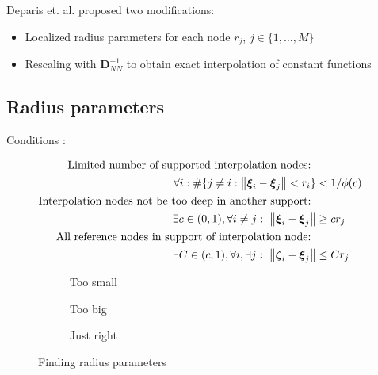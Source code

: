 \documentclass[11pt, a4paper]{article}
\begin{document}
Deparis et. al. \cite{deparis} proposed two modifications:

\begin{itemize}
    \item Localized radius parameters for each node $r_{j}$, $j \in \{1, \dots, M\}$
    \item Rescaling with $\mathbf{D}_{NN}^{-1}$ to obtain exact interpolation of constant functions
\end{itemize}

\subsection{Radius parameters}
\label{subsec:radius-parameters}
Conditions \cite{voet}:

\begin{subequations}
\begin{align}
    \text{Limited number of supported interpolation nodes: } \notag \\
    \forall i: \# \{j \neq i: \left\| \boldsymbol{\xi}_i - \boldsymbol{\xi}_j \right\| < r_i \} &< 1 / \phi(c) \label{equ:support-condition} \\
    \text{Interpolation nodes not be too deep in another support: } \notag \\ 
    \exists c \in (0, 1), \forall i \neq j:~\left\| \boldsymbol{\xi}_i - \boldsymbol{\xi}_j \right\| &\geq c r_j \label{equ:c-condition} \\
    \text{All reference nodes in support of interpolation node: } \notag \\ 
    \exists C \in (c, 1), \forall i, \exists j:~\left\| \boldsymbol{\zeta}_i - \boldsymbol{\xi}_j \right\| &\leq C r_j \label{equ:C-condition}
\end{align}
\label{equ:conditions}
\end{subequations}

\begin{figure}[ht]
    \centering
    \begin{subfigure}[b]{.32\linewidth}
        \centering
        
        \caption{Too small}\label{fig:radiusparameters1}
    \end{subfigure}
    \begin{subfigure}[b]{.32\linewidth}
        
        \caption{Too big}\label{fig:radiusparameters2}
    \end{subfigure}
    \begin{subfigure}[b]{.32\linewidth}
        
        \caption{Just right}\label{fig:radiusparameters3}
    \end{subfigure}
    \caption{Finding radius parameters}
    \label{fig:radiusparameters}
\end{figure}
\end{document}
